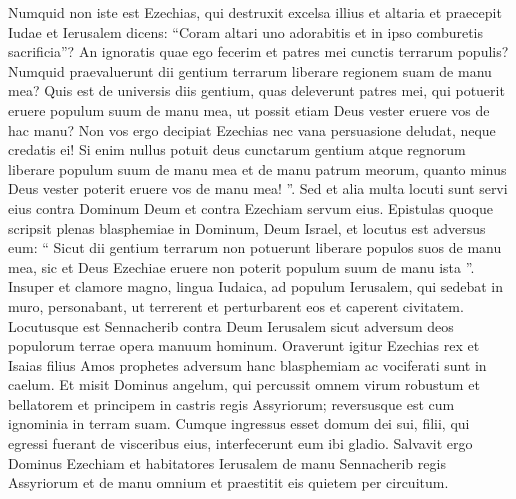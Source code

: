 \begin{biblechapter}
\begin{biblechapter}
\begin{biblechapter}
\begin{biblechapter}
\begin{biblechapter}
\begin{biblechapter}
\begin{biblechapter}
\begin{biblechapter}
\begin{biblechapter}
\begin{biblechapter}
\begin{biblechapter}
\begin{biblechapter}
\begin{biblechapter}
\begin{biblechapter}
\begin{biblechapter}
\begin{biblechapter}
\begin{biblechapter}
\begin{biblechapter}
\begin{biblechapter}
\begin{biblechapter}
\begin{biblechapter}
\begin{biblechapter}
\begin{biblechapter}
\begin{biblechapter}
\begin{biblechapter}
\begin{biblechapter}
\begin{biblechapter}
\begin{biblechapter}
\begin{biblechapter}
\begin{biblechapter}
\begin{biblechapter}
\begin{biblechapter}
\verse Numquid non iste est Ezechias, qui destruxit excelsa illius et altaria et praecepit Iudae et Ierusalem dicens: “Coram altari uno adorabitis et in ipso comburetis sacrificia”? 
\verse An ignoratis quae ego fecerim et patres mei cunctis terrarum populis? Numquid praevaluerunt dii gentium terrarum liberare regionem suam de manu mea? 
\verse Quis est de universis diis gentium, quas deleverunt patres mei, qui potuerit eruere populum suum de manu mea, ut possit etiam Deus vester eruere vos de hac manu? 
\verse Non vos ergo decipiat Ezechias nec vana persuasione deludat, neque credatis ei! Si enim nullus potuit deus cunctarum gentium atque regnorum liberare populum suum de manu mea et de manu patrum meorum, quanto minus Deus vester poterit eruere vos de manu mea! ”.
 \verse Sed et alia multa locuti sunt servi eius contra Dominum Deum et contra Ezechiam servum eius. 
\verse Epistulas quoque scripsit plenas blasphemiae in Dominum, Deum Israel, et locutus est adversus eum: “ Sicut dii gentium terrarum non potuerunt liberare populos suos de manu mea, sic et Deus Ezechiae eruere non poterit populum suum de manu ista ”.
 \verse Insuper et clamore magno, lingua Iudaica, ad populum Ierusalem, qui sedebat in muro, personabant, ut terrerent et perturbarent eos et caperent civitatem. 
 \verse Locutusque est Sennacherib contra Deum Ierusalem sicut adversum deos populorum terrae opera manuum hominum.
 \verse Oraverunt igitur Ezechias rex et Isaias filius Amos prophetes adversum hanc blasphemiam ac vociferati sunt in caelum. 
\verse Et misit Dominus angelum, qui percussit omnem virum robustum et bellatorem et principem in castris regis Assyriorum; reversusque est cum ignominia in terram suam. Cumque ingressus esset domum dei sui, filii, qui egressi fuerant de visceribus eius, interfecerunt eum ibi gladio. 
\verse Salvavit ergo Dominus Ezechiam et habitatores Ierusalem de manu Sennacherib regis Assyriorum et de manu omnium et praestitit eis quietem per circuitum. 

\end{biblechapter}
\end{biblechapter}
\end{biblechapter}
\end{biblechapter}
\end{biblechapter}
\end{biblechapter}
\end{biblechapter}
\end{biblechapter}
\end{biblechapter}
\end{biblechapter}
\end{biblechapter}
\end{biblechapter}
\end{biblechapter}
\end{biblechapter}
\end{biblechapter}
\end{biblechapter}
\end{biblechapter}
\end{biblechapter}
\end{biblechapter}
\end{biblechapter}
\end{biblechapter}
\end{biblechapter}
\end{biblechapter}
\end{biblechapter}
\end{biblechapter}
\end{biblechapter}
\end{biblechapter}
\end{biblechapter}
\end{biblechapter}
\end{biblechapter}
\end{biblechapter}
\end{biblechapter}
